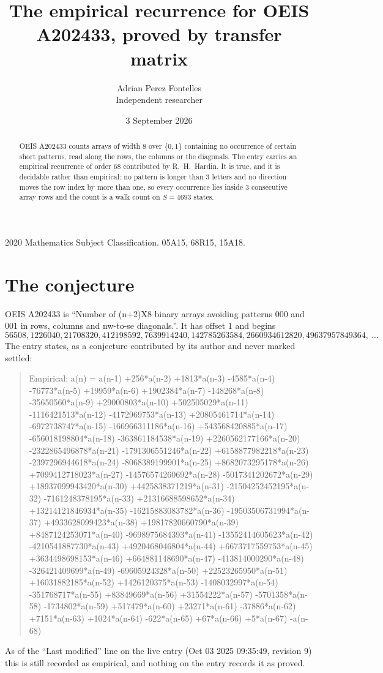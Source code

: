 \documentclass[11pt,a4paper]{article}
\title{The empirical recurrence for OEIS A202433, proved by transfer matrix}
\author{Adrian Perez Fontelles\\ \small Independent researcher}
\date{3 September 2026}
\theoremstyle{plain}
\theoremstyle{definition}
\begin{document}
\maketitle

\begin{abstract}
OEIS A202433 counts arrays of width $8$ over $\{0,1\}$ containing no occurrence of certain short
patterns, read along the rows, the columns or the diagonals. The entry carries an empirical
recurrence of order $68$ contributed by R.~H.~Hardin. It is true, and it is decidable
rather than empirical: no pattern is longer than $3$ letters and no direction moves the row
index by more than one, so every occurrence lies inside $3$ consecutive array rows and the
count is a walk count on $S=4693$ states.
\end{abstract}

\noindent\small 2020 Mathematics Subject Classification. 05A15, 68R15, 15A18.\normalsize

\section{The conjecture}

OEIS A202433 is ``Number of (n+2)X8 binary arrays avoiding patterns 000 and 001 in rows, columns and nw-to-se diagonals.''. It has offset $1$ and begins
\[
56508, 1226040, 21708320, 412198592, 7639914240, 142785263584, 2660934612820, 49637957849364,\ \dots
\]
The entry states, as a conjecture contributed by its author and never marked settled:
\begin{quote}
Empirical: a(n) = a(n-1) +256*a(n-2) +1813*a(n-3) -4585*a(n-4) -76773*a(n-5) +19959*a(n-6) +1902384*a(n-7) -148268*a(n-8) -35650560*a(n-9) +29000803*a(n-10) +502505029*a(n-11) -1116421513*a(n-12) -4172969753*a(n-13) +20805461714*a(n-14) -6972738747*a(n-15) -166966311186*a(n-16) +543568420885*a(n-17) -656018198804*a(n-18) -363861184538*a(n-19) +2260562177166*a(n-20) -2322865496878*a(n-21) -1791306551246*a(n-22) +6158877982218*a(n-23) -2397296944618*a(n-24) -8068389199901*a(n-25) +8682073295178*a(n-26) +7099412718023*a(n-27) -14576574260692*a(n-28) -5017341202672*a(n-29) +18937099943420*a(n-30) +4425838371219*a(n-31) -21504252452195*a(n-32) -7161248378195*a(n-33) +21316688598652*a(n-34) +13214121846934*a(n-35) -16215883083782*a(n-36) -19503506731994*a(n-37) +4933628099423*a(n-38) +19817820660790*a(n-39) +8487124253071*a(n-40) -9698975684393*a(n-41) -13552414605623*a(n-42) -4210541887730*a(n-43) +4920468046804*a(n-44) +6673717559753*a(n-45) +3634498698153*a(n-46) +664881148690*a(n-47) -413814000290*a(n-48) -326421409699*a(n-49) -69605924328*a(n-50) +22523265950*a(n-51) +16031882185*a(n-52) +1426120375*a(n-53) -1408032997*a(n-54) -351768717*a(n-55) +83849669*a(n-56) +31554222*a(n-57) -5701358*a(n-58) -1734802*a(n-59) +517479*a(n-60) +23271*a(n-61) -37886*a(n-62) +7151*a(n-63) +1024*a(n-64) -622*a(n-65) +67*a(n-66) +5*a(n-67) -a(n-68)
\end{quote}
As of the ``Last modified'' line on the live entry (Oct 03 2025 09:35:49, revision 9) this is still
recorded as empirical, and nothing on the entry records it as proved.
\end{document}

